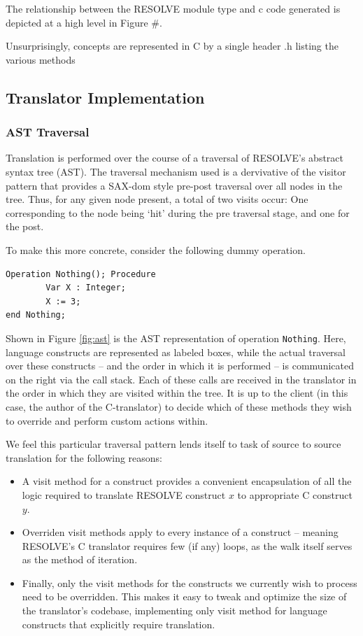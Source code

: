 \documentclass{sig-alternate}
\begin{document}
The relationship between the RESOLVE module type and c code generated is depicted at a high level in Figure \#.

Unsurprisingly, concepts are represented in C by a single header .h listing the various methods 



\subsection{Translator Implementation}

\subsubsection{AST Traversal}
Translation is performed over the course of a traversal of RESOLVE's abstract syntax tree (AST). The traversal mechanism used is a dervivative of the visitor pattern that provides a SAX-dom style pre-post traversal over all nodes in the tree. Thus, for any given node present, a total of two visits occur: One corresponding to the node being `hit' during the pre traversal stage, and one for the post. 

To make this more concrete, consider the following dummy operation.

\begin{verbatim}
Operation Nothing(); Procedure
        Var X : Integer;
        X := 3;
end Nothing;
\end{verbatim}

Shown in Figure \ref{fig:ast} is the AST representation of operation \texttt{Nothing}. Here, language constructs are represented as labeled boxes, while the actual traversal over these constructs -- and the order in which it is performed -- is communicated on the right via the call stack. Each of these calls are received in the translator in the order in which they are visited within the tree. It is up to the client (in this case, the author of the C-translator) to decide which of these methods they wish to override and perform custom actions within. 

We feel this particular traversal pattern lends itself to task of source to source translation for the following reasons:

\begin{itemize}
\item A visit method for a construct provides a convenient encapsulation of all the logic required to translate RESOLVE construct $x$ to appropriate C construct $y$.

\item Overriden visit methods apply to every instance of a construct -- meaning RESOLVE's C translator requires few (if any) loops, as the walk itself serves as the method of iteration.

\item Finally, only the visit methods for the constructs we currently wish to process need to be overridden. This makes it easy to tweak and optimize the size of the translator's codebase, implementing only visit method for language constructs that explicitly require translation.  
\end{itemize}
\end{document}
